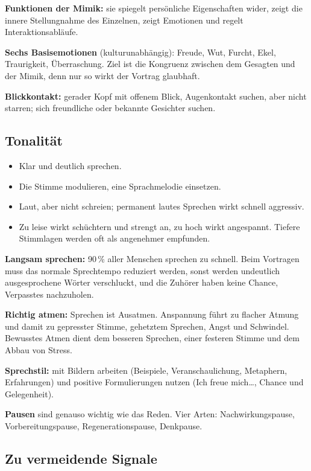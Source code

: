 \documentclass[12pt, a4paper]{article}
\begin{document}
\textbf{Funktionen der Mimik:} sie spiegelt persönliche Eigenschaften wider,
zeigt die innere Stellungnahme des Einzelnen, zeigt Emotionen und regelt
Interaktionsabläufe.

\textbf{Sechs Basisemotionen} (kulturunabhängig): Freude, Wut, Furcht, Ekel,
Traurigkeit, Überraschung. Ziel ist die Kongruenz zwischen dem Gesagten und
der Mimik, denn nur so wirkt der Vortrag glaubhaft.

\textbf{Blickkontakt:} gerader Kopf mit offenem Blick, Augenkontakt suchen,
aber nicht starren; sich freundliche oder bekannte Gesichter suchen.

\subsection{Tonalität}

\begin{itemize}
  \item Klar und deutlich sprechen.
  \item Die Stimme modulieren, eine Sprachmelodie einsetzen.
  \item Laut, aber nicht schreien; permanent lautes Sprechen wirkt schnell
        aggressiv.
  \item Zu leise wirkt schüchtern und strengt an, zu hoch wirkt angespannt.
        Tiefere Stimmlagen werden oft als angenehmer empfunden.
\end{itemize}

\textbf{Langsam sprechen:} 90\,\% aller Menschen sprechen zu schnell. Beim
Vortragen muss das normale Sprechtempo reduziert werden, sonst werden
undeutlich ausgesprochene Wörter verschluckt, und die Zuhörer haben keine
Chance, Verpasstes nachzuholen.

\textbf{Richtig atmen:} Sprechen ist Ausatmen. Anspannung führt zu flacher
Atmung und damit zu gepresster Stimme, gehetztem Sprechen, Angst und
Schwindel. Bewusstes Atmen dient dem besseren Sprechen, einer festeren
Stimme und dem Abbau von Stress.

\textbf{Sprechstil:} mit Bildern arbeiten (Beispiele, Veranschaulichung,
Metaphern, Erfahrungen) und positive Formulierungen nutzen
(\glqq Ich freue mich\ldots\grqq{}, \glqq Chance und Gelegenheit\grqq{}).

\textbf{Pausen} sind genauso wichtig wie das Reden. Vier Arten:
Nachwirkungspause, Vorbereitungspause, Regenerationspause, Denkpause.

\subsection{Zu vermeidende Signale}
\end{document}

